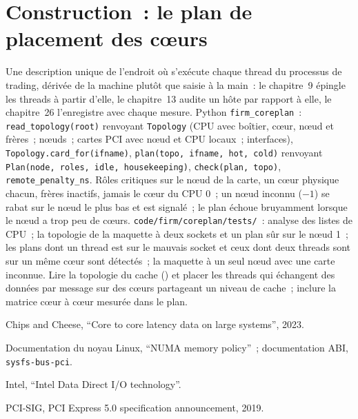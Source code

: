 \section{Construction~: le plan de placement des cœurs}\label{bld:ll:multi-socket-machines-and-interconnects:coreplan}

\begin{build}
 Une description unique de l'endroit où s'exécute chaque thread du processus de trading, dérivée de la machine plutôt que
saisie à la main~: le chapitre~9 épingle les threads à partir d'elle, le chapitre~13 audite un hôte par rapport à elle, le chapitre~26 l'enregistre avec chaque
mesure.
 Python \texttt{firm\_coreplan}~: \texttt{read\_topology(root)} renvoyant \texttt{Topology} (CPU avec
boîtier, cœur, nœud et frères~; nœuds~; cartes PCI avec nœud et CPU locaux~; interfaces), \texttt{Topology.card\_for(ifname)},
\texttt{plan(topo, ifname, hot, cold)} renvoyant \texttt{Plan(node, roles, idle, housekeeping)},
\texttt{check(plan, topo)}, \texttt{remote\_penalty\_ns}.
 Rôles critiques sur le nœud de la carte, un cœur physique chacun, frères inactifs, jamais le cœur du CPU 0~; un nœud inconnu
($-1$) se rabat sur le nœud le plus bas et est signalé~; le plan échoue bruyamment lorsque le nœud a trop peu de cœurs.
 \texttt{code/firm/coreplan/tests/}~: analyse des listes de CPU~; la topologie de la maquette à deux sockets et un
plan sûr sur le nœud 1~; les plans dont un thread est sur le mauvais socket et ceux dont deux threads sont sur un même cœur sont détectés~; la maquette à un seul nœud avec
une carte inconnue.
 Lire la topologie du cache () et placer les threads qui échangent des données par
message sur des cœurs partageant un niveau de cache~; inclure la matrice cœur à cœur mesurée dans le plan.
\end{build}

\begin{omsources}
\item Chips and Cheese, ``Core to core latency data on large systems'', 2023.
\item Documentation du noyau Linux, ``NUMA memory policy''~; documentation ABI, \texttt{sysfs-bus-pci}.
\item Intel, ``Intel Data Direct I/O technology''.
\item PCI-SIG, PCI Express 5.0 specification announcement, 2019.
\end{omsources}

